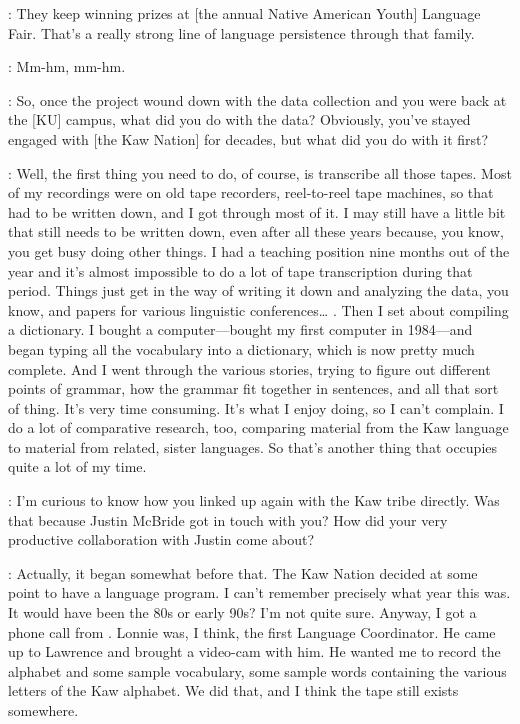 \documentclass[output=paper]{LSP/langsci}
\begin{document}
: They keep winning prizes at [the annual Native American Youth] Language Fair. That's a really strong line of language persistence through that family.

: Mm-hm, mm-hm.

: So, once the project wound down with the data collection and you were back at the [KU] campus, what did you do with the data? Obviously, you've stayed engaged with [the Kaw Nation] for decades, but what did you do with it first?

: Well, the first thing you need to do, of course, is transcribe all those tapes. Most of my recordings were on old tape recorders, reel-to-reel tape machines, so that had to be written down, and I got through most of it. I may still have a little bit that still needs to be written down, even after all these years because, you know, you get busy doing other things. I had a teaching position nine months out of the year and it's almost impossible to do a lot of tape transcription during that period. Things just get in the way of writing it down and analyzing the data, you know, and papers for various linguistic conferences{\ldots} . Then I set about compiling a dictionary. I bought a computer---bought my first computer in 1984---and began typing all the vocabulary into a dictionary, which is now pretty much complete. And I went through the various stories, trying to figure out different points of grammar, how the grammar fit together in sentences, and all that sort of thing. It's very time consuming. It's what I enjoy doing, so I can't complain. I do a lot of comparative research, too, comparing material from the Kaw language to material from related, sister languages. So that's another thing that occupies quite a lot of my time.

: I'm curious to know how you linked up again with the Kaw tribe directly. Was that because Justin McBride got in touch with you? How did your very productive collaboration with Justin come about?

: Actually, it began somewhat before that. The Kaw Nation decided at some point to have a language program. I can't remember precisely what year this was. It would have been the 80s or early 90s? I'm not quite sure. Anyway, I got a phone call from . Lonnie was, I think, the first Language Coordinator. He came up to Lawrence and brought a video-cam with him. He wanted me to record the alphabet and some sample vocabulary, some sample words containing the various letters of the Kaw alphabet. We did that, and I think the tape still exists somewhere.
\end{document}
